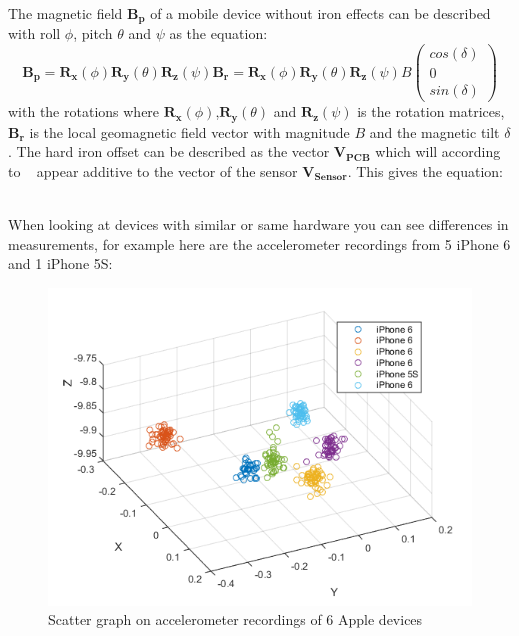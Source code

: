 The magnetic field $\boldsymbol{B_p}$ of a mobile device without iron effects can be described with roll $\phi$, pitch $\theta$ and $\psi$ as the equation:
\begin{equation} \label{eq:magnField}
  \boldsymbol{B_p} = 
  \boldsymbol{R_x}(\phi)\boldsymbol{R_y}(\theta)\boldsymbol{R_z}(\psi)\boldsymbol{B_r} = 
  \boldsymbol{R_x}(\phi)\boldsymbol{R_y}(\theta)\boldsymbol{R_z}(\psi)B\begin{pmatrix}cos(\delta) \\ 0  \\ sin(\delta)\end{pmatrix}
\end{equation}
with the rotations where $ \boldsymbol{R_x}(\phi)$,$\boldsymbol{R_y}(\theta)$ and $\boldsymbol{R_z}(\psi)$ is the rotation matrices, $\boldsymbol{B_r}$ is the local geomagnetic field vector with magnitude $B$ and the magnetic tilt $\delta$. The hard iron offset can be described as the vector $\boldsymbol{V_{PCB}}$ which will according to ~\cite{sensor:magnIron} appear additive to the vector of the sensor $\boldsymbol{V_{Sensor}}$. This gives the equation:
\begin{equation}
\end{equation}
~\cite[]{sensor:magnIron}

  When looking at devices with similar or same hardware you can see differences in measurements, for example here are the accelerometer recordings from 5 iPhone 6 and 1 iPhone 5S:
\begin{figure}[H]
\centering
\includegraphics[scale=.6]{img/scatteriPhone}
\caption{Scatter graph on accelerometer recordings of 6 Apple devices}
\label{fig:digraph}
\end{figure}